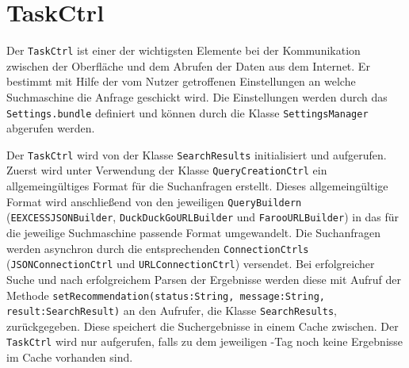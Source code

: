 
\section{TaskCtrl}

Der \lstinline|TaskCtrl| ist einer der wichtigsten Elemente bei der Kommunikation zwischen der Oberfläche und dem Abrufen der Daten aus dem Internet. Er bestimmt mit Hilfe der vom Nutzer getroffenen Einstellungen an welche Suchmaschine die Anfrage geschickt wird. Die Einstellungen werden durch das \lstinline|Settings.bundle| definiert und können durch die Klasse \lstinline|SettingsManager| abgerufen werden. 

Der \lstinline|TaskCtrl| wird von der Klasse \lstinline|SearchResults| initialisiert und aufgerufen. Zuerst wird unter Verwendung der Klasse \lstinline|QueryCreationCtrl| ein allgemeingültiges Format für die Suchanfragen erstellt. Dieses allgemeingültige Format wird anschließend von den jeweiligen \verb|QueryBuildern| (\lstinline|EEXCESSJSONBuilder|, \lstinline|DuckDuckGoURLBuilder| und \lstinline|FarooURLBuilder|) in das für die jeweilige Suchmaschine passende Format umgewandelt. Die Suchanfragen werden asynchron durch die entsprechenden \verb|ConnectionCtrls| (\lstinline|JSONConnectionCtrl| und \lstinline|URLConnectionCtrl|) versendet. Bei erfolgreicher Suche und nach erfolgreichem Parsen der Ergebnisse werden diese mit Aufruf der Methode 
\lstinline|setRecommendation(status:String, message:String, result:SearchResult)| an den Aufrufer, die Klasse \lstinline|SearchResults|, zurückgegeben. Diese speichert die Suchergebnisse in einem Cache zwischen. Der \lstinline|TaskCtrl| wird nur aufgerufen, falls zu dem jeweiligen \SEARCH-Tag noch keine Ergebnisse im Cache vorhanden sind. 

